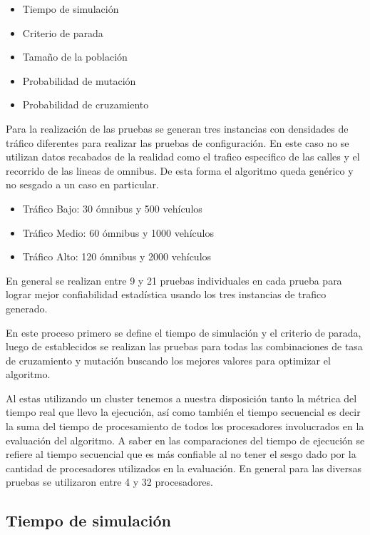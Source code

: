 \begin{itemize}
	\item Tiempo de simulación	
	\item Criterio de parada
	\item Tamaño de la población
	\item Probabilidad de mutación
	\item Probabilidad de cruzamiento
\end{itemize}

Para la realización de las pruebas se generan tres instancias con densidades de tráfico diferentes para realizar las pruebas de configuración. En este caso no se utilizan datos recabados de la realidad como  el trafico especifico de las calles y el recorrido de las lineas de omnibus. De esta forma el algoritmo queda genérico y no sesgado a un caso en particular.


\begin{itemize}
	\item Tráfico Bajo: 30 ómnibus y 500 vehículos	
	\item Tráfico Medio: 60 ómnibus y 1000 vehículos
	\item Tráfico Alto: 120 ómnibus y 2000 vehículos
\end{itemize}



En general se realizan entre 9 y 21 pruebas individuales en cada prueba para lograr mejor confiabilidad estadística usando los tres instancias de trafico generado.

En este proceso primero se define el tiempo de simulación y el criterio de parada, luego de establecidos se realizan las pruebas para todas las combinaciones de tasa de cruzamiento y mutación buscando los mejores valores para optimizar el algoritmo.

Al estas utilizando un cluster tenemos a nuestra disposición tanto la métrica del tiempo real que llevo la ejecución, así como también el tiempo secuencial es decir la suma del tiempo de procesamiento de todos los procesadores involucrados en la evaluación del algoritmo. 
A saber en las comparaciones del tiempo de ejecución se refiere al tiempo secuencial que es más confiable al no tener el sesgo dado por la cantidad de procesadores utilizados en la evaluación.
En general para las diversas pruebas se utilizaron entre 4 y 32 procesadores.




\subsection{Tiempo de simulación}


